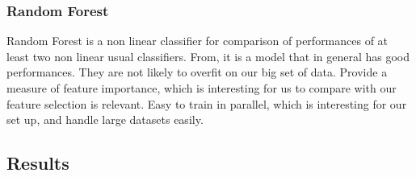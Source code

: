 \documentclass{article}
\begin{document}
    \subsubsection{Random Forest}
    Random Forest is a non linear classifier for comparison of performances of at least two non linear usual classifiers.
    From\cite{MLmodelsComparison}, it is a model that in general has good performances.
    They are not likely to overfit on our big set of data.
    Provide a measure of feature importance, which is interesting for us to compare with our feature selection is relevant.
    Easy to train in parallel, which is interesting for our set up, and handle large datasets easily.

    \subsection{Results}\label{subsec:results}

\end{document}
